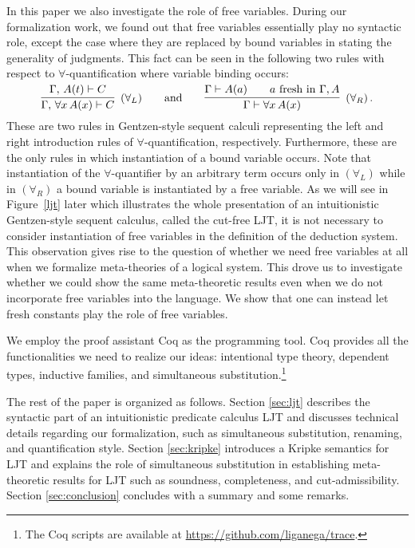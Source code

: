 \documentclass{kms-j}
\theoremstyle{plain}
\theoremstyle{remark}
\begin{document}
In this paper we also investigate the role of free variables.
During our formalization work, we found out that free variables essentially play
no syntactic role,
except the case where they are replaced by bound variables in stating the generality of judgments.
This fact can be seen in the following two rules with respect to $\forall$-quantification
where variable binding occurs:
\smallskip

\[
\seqr{\Ga,\, A(t) \vd C}{\Ga,\, \forall x\, A(x) \vd C}{(\forall_L)} \qquad\textrm{and}\qquad
\seqr{\Gamma \vdash A(a) \qquad \mbox{$a$ fresh in $\Gamma, A$}}
    {\Gamma \vdash \forall x\, A(x)}{(\forall_R)}\, .
\]
%
These are two rules in Gentzen-style sequent calculi representing
the left and right introduction rules of $\forall$-quantification, respectively.
Furthermore, these are the only rules in which instantiation of a bound variable occurs.
Note that instantiation of the $\forall$-quantifier by an arbitrary term occurs only in $(\forall_L)$
while in $(\forall_R)$ a bound variable is instantiated by a free variable.
As we will see in Figure~\ref{ljt} later which illustrates the whole
presentation of an intuitionistic Gentzen-style sequent calculus,
called the cut-free LJT, it is not necessary to consider instantiation of free variables in the definition of the deduction system.
%
This observation gives rise to the question of whether we need
free variables at all when we formalize meta-theories of a logical
system. This drove us to investigate whether we could show the same meta-theoretic results even when
we do not incorporate free variables into the language.
We show that one can instead let fresh constants play the role of free variables.

We employ the proof assistant Coq \citep{coq-reference} as the programming tool.
Coq provides all the functionalities we need to realize our ideas:
intentional type theory, dependent types,
inductive families, and simultaneous substitution.\footnote{The Coq scripts are available at \url{https://github.com/liganega/trace}.}

The rest of the paper is organized as follows.
Section \ref{sec:ljt} describes the syntactic part of an intuitionistic predicate calculus LJT
and discusses technical details regarding our formalization, such as simultaneous substitution, renaming, and quantification style.
%
Section \ref{sec:kripke} introduces a Kripke semantics for LJT and explains
the role of simultaneous substitution in establishing meta-theoretic results for LJT
such as soundness, completeness, and cut-admissibility.
%
Section \ref{sec:conclusion} concludes with a summary and some remarks.
\end{document}
